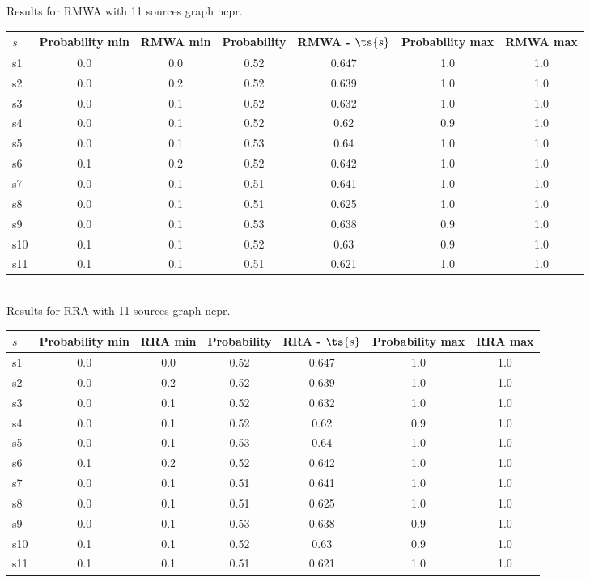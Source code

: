 \documentclass{article}
\begin{document}
\noindent Results for RMWA with 11 sources graph ncpr.

\noindent\begin{tabular}{|l|c|c|c|c|c|c|}
\hline
$s$& Probability min & RMWA min & Probability & RMWA - $\ts{s}$ & Probability max & RMWA max\\
\hline
s1 &0.0 & 0.0 & 0.52 & 0.647 & 1.0 & 1.0\\
\hline
s2 &0.0 & 0.2 & 0.52 & 0.639 & 1.0 & 1.0\\
\hline
s3 &0.0 & 0.1 & 0.52 & 0.632 & 1.0 & 1.0\\
\hline
s4 &0.0 & 0.1 & 0.52 & 0.62 & 0.9 & 1.0\\
\hline
s5 &0.0 & 0.1 & 0.53 & 0.64 & 1.0 & 1.0\\
\hline
s6 &0.1 & 0.2 & 0.52 & 0.642 & 1.0 & 1.0\\
\hline
s7 &0.0 & 0.1 & 0.51 & 0.641 & 1.0 & 1.0\\
\hline
s8 &0.0 & 0.1 & 0.51 & 0.625 & 1.0 & 1.0\\
\hline
s9 &0.0 & 0.1 & 0.53 & 0.638 & 0.9 & 1.0\\
\hline
s10 &0.1 & 0.1 & 0.52 & 0.63 & 0.9 & 1.0\\
\hline
s11 &0.1 & 0.1 & 0.51 & 0.621 & 1.0 & 1.0\\
\hline
\end{tabular}\\

\noindent Results for RRA with 11 sources graph ncpr.

\noindent\begin{tabular}{|l|c|c|c|c|c|c|}
\hline
$s$& Probability min & RRA min & Probability & RRA - $\ts{s}$ & Probability max & RRA max\\
\hline
s1 &0.0 & 0.0 & 0.52 & 0.647 & 1.0 & 1.0\\
\hline
s2 &0.0 & 0.2 & 0.52 & 0.639 & 1.0 & 1.0\\
\hline
s3 &0.0 & 0.1 & 0.52 & 0.632 & 1.0 & 1.0\\
\hline
s4 &0.0 & 0.1 & 0.52 & 0.62 & 0.9 & 1.0\\
\hline
s5 &0.0 & 0.1 & 0.53 & 0.64 & 1.0 & 1.0\\
\hline
s6 &0.1 & 0.2 & 0.52 & 0.642 & 1.0 & 1.0\\
\hline
s7 &0.0 & 0.1 & 0.51 & 0.641 & 1.0 & 1.0\\
\hline
s8 &0.0 & 0.1 & 0.51 & 0.625 & 1.0 & 1.0\\
\hline
s9 &0.0 & 0.1 & 0.53 & 0.638 & 0.9 & 1.0\\
\hline
s10 &0.1 & 0.1 & 0.52 & 0.63 & 0.9 & 1.0\\
\hline
s11 &0.1 & 0.1 & 0.51 & 0.621 & 1.0 & 1.0\\
\hline
\end{tabular}\\
\end{document}
